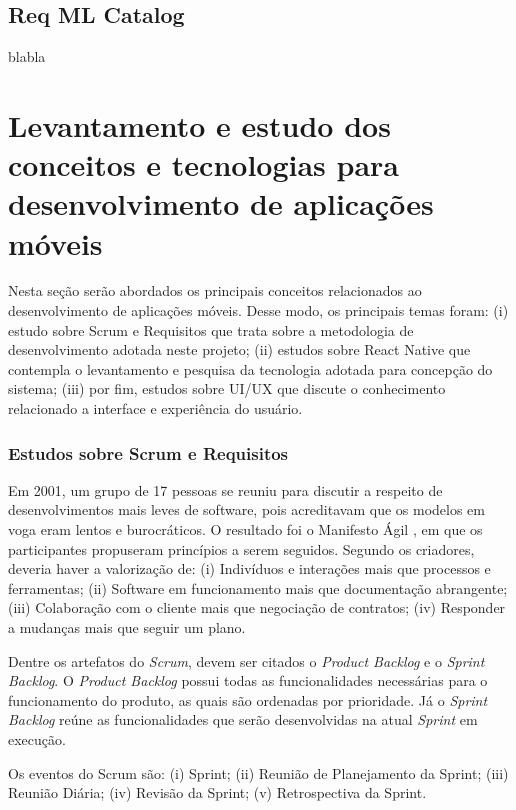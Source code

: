 \subsection{Req ML Catalog}
blabla

\section{Levantamento e estudo dos conceitos e tecnologias para desenvolvimento de aplicações móveis}

Nesta seção serão abordados os principais conceitos relacionados ao desenvolvimento de aplicações móveis. Desse modo, os principais temas foram: (i) estudo sobre Scrum e Requisitos que trata sobre a metodologia de desenvolvimento adotada neste projeto; (ii) estudos sobre React Native que contempla o levantamento e pesquisa da tecnologia adotada para concepção do sistema; (iii) por fim, estudos sobre UI/UX que discute o conhecimento relacionado a interface e experiência do usuário.

\subsubsection{Estudos sobre Scrum e Requisitos} 
Em 2001, um grupo de 17 pessoas se reuniu para discutir a respeito de desenvolvimentos mais leves de software, pois acreditavam que os modelos em voga eram lentos e burocráticos. O resultado foi o Manifesto Ágil \citep{agileManifesto}, em que os participantes propuseram princípios a serem seguidos. Segundo os criadores, deveria haver a valorização de: (i) Indivíduos e interações mais que processos e ferramentas; (ii) Software em funcionamento mais que documentação abrangente; (iii) Colaboração com o cliente mais que negociação de contratos; (iv) Responder a mudanças mais que seguir um plano.

Dentre os artefatos do \textit{Scrum}, devem ser citados o \textit{Product Backlog} e o \textit{Sprint Backlog}. O \textit{Product Backlog} possui todas as funcionalidades necessárias para o funcionamento do produto, as quais são ordenadas por prioridade. Já o \textit{Sprint Backlog} reúne as funcionalidades que serão desenvolvidas na atual \textit{Sprint} em execução.

Os eventos do Scrum são: (i) Sprint; (ii) Reunião de Planejamento da Sprint; (iii) Reunião Diária; (iv) Revisão da Sprint; (v) Retrospectiva da Sprint.


